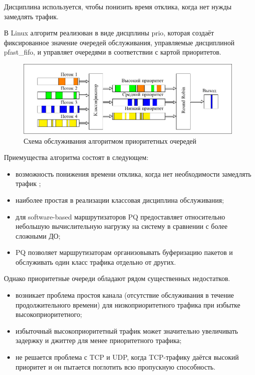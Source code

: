     Дисциплина используется, чтобы понизить время отклика, когда нет нужды замедлять трафик\cite{tcprio}. 

    В Linux алгоритм реализован в виде дисцплины prio, которая создаёт фиксированное
    значение очередей обслуживания, управляемые дисциплиной pfast\_fifo, и управляет
    очередями в соответствии с картой приоритетов.\cite{tcprio}

    \begin{figure}[ht!]
        \center
        \includegraphics[scale=1.1]{pdfimages/pq.pdf}
        \caption{Схема обслуживания алгоритмом приоритетных очередей}
    \end{figure}

    Приемущества алгоритма состоят в следующем:
    \begin{itemize}
		\item возможность понижения времени отклика, когда нет необходимости замедлять трафик \cite{tcprio};
        \item наиболее простая в реализации классовая дисциплина обслуживания;
        \item для software-based маршрутизаторов PQ предоставляет относительно небольшую
             вычислительную нагрузку на систему в сравнении с более сложными ДО;
        \item PQ позволяет маршрутизаторам организовывать буферизацию пакетов и обслуживать
             один класс трафика отдельно от других. \cite{suppdiff}
    \end{itemize}

    Однако приоритетные очереди обладают рядом существенных недостатков.
    \begin{itemize}
        \item возникает проблема простоя канала (отсутствие обслуживания в течение продолжительного времени)
			  для низкоприоритетного трафика при избытке высокоприоритетного\cite{packethandling};
        \item избыточный высокоприоритетный трафик может значительно увеличивать
                задержку и джиттер для менее приоритетного трафика;
        \item не решается проблема с TCP и UDP, когда TCP-трафику даётся высокий приоритет и он
                пытается поглотить всю пропускную способность. \cite{suppdiff}
    \end{itemize}


